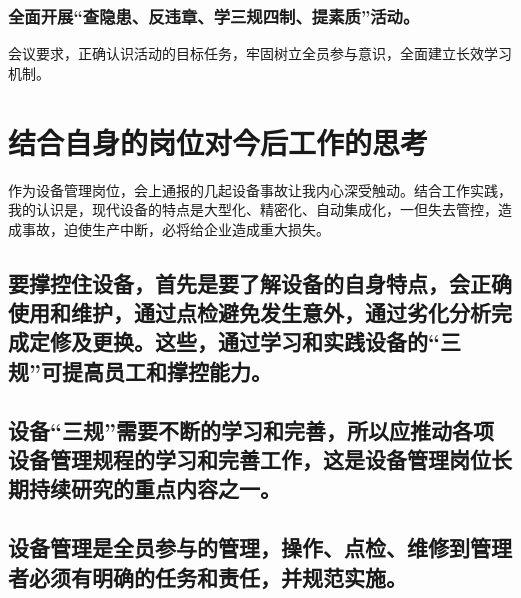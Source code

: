 \documentclass[11pt]{article}
\begin{document}
\subsubsection{全面开展“查隐患、反违章、学三规四制、提素质”活动。}
\label{sec-1-3-2}

会议要求，正确认识活动的目标任务，牢固树立全员参与意识，全面建立长效学习机制。
\section{结合自身的岗位对今后工作的思考}
\label{sec-2}

作为设备管理岗位，会上通报的几起设备事故让我内心深受触动。结合工作实践，我的认识是，现代设备的特点是大型化、精密化、自动集成化，一但失去管控，造成事故，迫使生产中断，必将给企业造成重大损失。
\subsection{要撑控住设备，首先是要了解设备的自身特点，会正确使用和维护，通过点检避免发生意外，通过劣化分析完成定修及更换。这些，通过学习和实践设备的“三规”可提高员工和撑控能力。}
\label{sec-2-1}
\subsection{设备“三规”需要不断的学习和完善，所以应推动各项设备管理规程的学习和完善工作，这是设备管理岗位长期持续研究的重点内容之一。}
\label{sec-2-2}
\subsection{设备管理是全员参与的管理，操作、点检、维修到管理者必须有明确的任务和责任，并规范实施。}
\label{sec-2-3}
\end{document}
